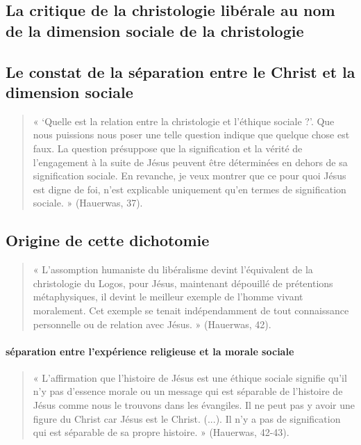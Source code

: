 \subsection{La critique de la christologie libérale au nom de la dimension sociale de la
christologie}



\subsection{Le constat de la séparation entre le Christ et la dimension sociale}

\begin{quote}
    « ‘Quelle est la relation entre la christologie et l’éthique sociale ?’. Que nous puissions nous poser une
telle question indique que quelque chose est faux. La question présuppose que la signification et la
vérité de l’engagement à la suite de Jésus peuvent être déterminées en dehors de sa signification
sociale. En revanche, je veux montrer que ce pour quoi Jésus est digne de foi, n’est explicable
uniquement qu’en termes de signification sociale. » (Hauerwas, 37).
\end{quote}
 \subsection{Origine de cette dichotomie}

\begin{quote}
    « L’assomption humaniste du libéralisme devint l’équivalent de la christologie du Logos, pour Jésus,
maintenant dépouillé de prétentions métaphysiques, il devint le meilleur exemple de l’homme vivant
moralement. Cet exemple se tenait indépendamment de tout connaissance personnelle ou de relation
avec Jésus. » (Hauerwas, 42).
\end{quote}
 
 \paragraph{séparation entre l’expérience religieuse et la morale sociale}

 \begin{quote}
     « L’affirmation que l’histoire de Jésus est une éthique sociale signifie qu’il n’y pas d’essence morale
ou un message qui est séparable de l’histoire de Jésus comme nous le trouvons dans les évangiles. Il
ne peut pas y avoir une figure du Christ car Jésus est le Christ. (...). Il n’y a pas de signification qui est
séparable de sa propre histoire. » (Hauerwas, 42-43).
 \end{quote}
